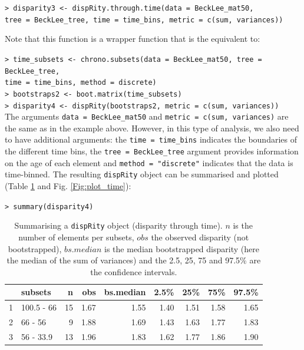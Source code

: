 \documentclass[12pt,letterpaper]{article}
\newcommand{\disp}{\texttt{dispRity} }
\begin{document}
\noindent
\texttt{> disparity3 <- dispRity.through.time(data = BeckLee\_mat50,}\\
\texttt{tree = BeckLee\_tree, time = time\_bins, metric = c(sum, variances))}

\noindent Note that this function is a wrapper function that is the equivalent to:

\noindent \texttt{> time\_subsets <- chrono.subsets(data = BeckLee\_mat50, tree = BeckLee\_tree,}\\ \texttt{time = time\_bins, method = \textquotedbl discrete\textquotedbl)}\\
\noindent \texttt{> bootstraps2 <- boot.matrix(time\_subsets)}\\
\noindent \texttt{> disparity4 <- dispRity(bootstraps2, metric = c(sum, variances))}\\

\noindent The arguments \texttt{data = BeckLee\_mat50} and \texttt{metric = c(sum, variances)} are the same as in the example above.
However, in this type of analysis, we also need to have additional arguments: the \texttt{time = time\_bins} indicates the boundaries of the different time bins, the \texttt{tree = BeckLee\_tree} argument provides information on the age of each element and \texttt{method = "discrete"} indicates that the data is time-binned.
The resulting \disp object can be summarised and plotted (Table \ref{Tab:summary_time} and Fig. \ref{Fig:plot_time}):

\noindent \texttt{> summary(disparity4)}

\begin{table}[ht]
\centering
\begin{tabular}{rlrrrrrrr}
  \hline
 & subsets & n & obs & bs.median & 2.5\% & 25\% & 75\% & 97.5\% \\ 
  \hline
1 & 100.5 - 66 &  15 & 1.67 & 1.55 & 1.40 & 1.51 & 1.58 & 1.65 \\ 
  2 & 66 - 56 &   9 & 1.88 & 1.69 & 1.43 & 1.63 & 1.77 & 1.83 \\ 
  3 & 56 - 33.9 &  13 & 1.96 & 1.83 & 1.62 & 1.77 & 1.86 & 1.90 \\ 
   \hline
\end{tabular}
\caption{Summarising a \disp object (disparity through time). $n$ is the number of elements per subsets, $obs$ the observed disparity (not bootstrapped), $bs.median$ is the median bootstrapped disparity (here the median of the sum of variances) and the 2.5, 25, 75 and 97.5\% are the confidence intervals.}
\label{Tab:summary_time}
\end{table}
\end{document}
